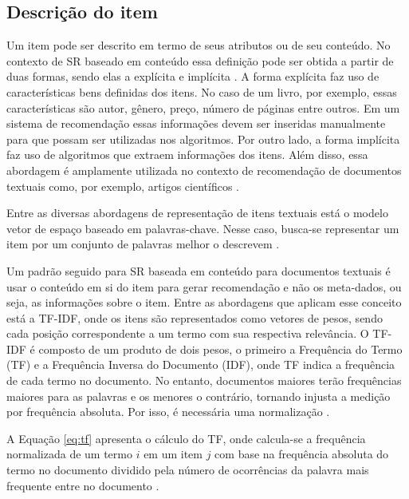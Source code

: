     \subsection{Descrição do item}
   
    Um item pode ser descrito em termo de seus atributos ou de seu conteúdo. No contexto de SR baseado em conteúdo essa definição pode ser obtida a partir de duas formas, sendo elas a explícita e implícita \cite{Jannach2010}. A forma explícita faz uso de características bens definidas dos itens. No caso de um livro, por exemplo, essas características são autor, gênero, preço, número de páginas entre outros. Em um sistema de recomendação essas informações devem ser inseridas manualmente para que possam ser utilizadas nos algoritmos. Por outro lado, a forma implícita faz uso de algoritmos que extraem informações dos itens. Além disso, essa abordagem é amplamente utilizada no contexto de recomendação de documentos textuais como, por exemplo, artigos científicos \cite{Garcia2013}.
    
    
    Entre as diversas abordagens de representação de itens textuais está o modelo vetor de espaço baseado em palavras-chave. Nesse caso, busca-se representar um item por um conjunto de palavras melhor o descrevem \cite{Jannach2010}.
    
    Um padrão seguido para SR baseada em conteúdo para documentos textuais é usar o conteúdo em si do item para gerar recomendação e não os meta-dados, ou seja, as informações sobre o item. Entre as abordagens que aplicam esse conceito está a TF-IDF, onde os itens são representados como vetores de pesos, sendo cada posição correspondente a um termo com sua respectiva relevância. 
    O TF-IDF é composto de um produto de dois pesos, o primeiro a Frequência do Termo (TF) e a Frequência Inversa do Documento (IDF), onde TF indica a frequência de cada termo no documento. No entanto, documentos maiores terão frequências maiores para as palavras e os menores o contrário, tornando injusta a medição por frequência absoluta. Por isso, é necessária uma normalização \cite{Jannach2010}. 
    
    A Equação \ref{eq:tf} apresenta o cálculo do TF, onde calcula-se a frequência normalizada de um termo $i$ em um item $j$ com base na frequência absoluta do termo no documento dividido pela número de ocorrências da palavra mais frequente entre no documento \cite{Jannach2010}.
     
